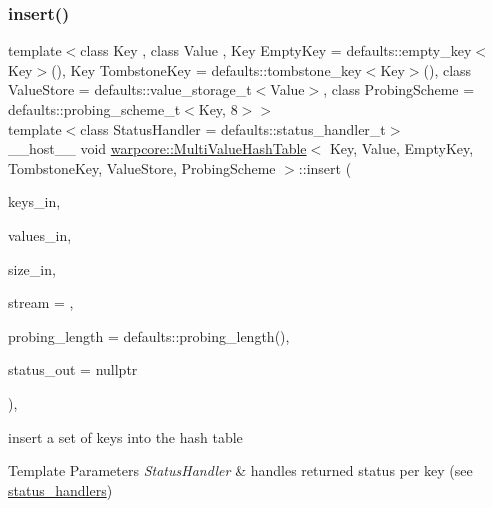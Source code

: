 \subsubsection{\texorpdfstring{insert()}{insert()}\hspace{0.1cm}{\footnotesize\ttfamily [2/2]}}
{\footnotesize\ttfamily template$<$class Key , class Value , Key Empty\+Key = defaults\+::empty\+\_\+key$<$\+Key$>$(), Key Tombstone\+Key = defaults\+::tombstone\+\_\+key$<$\+Key$>$(), class Value\+Store  = defaults\+::value\+\_\+storage\+\_\+t$<$\+Value$>$, class Probing\+Scheme  = defaults\+::probing\+\_\+scheme\+\_\+t$<$\+Key, 8$>$$>$ \\
template$<$class Status\+Handler  = defaults\+::status\+\_\+handler\+\_\+t$>$ \\
\+\_\+\+\_\+host\+\_\+\+\_\+ void \hyperlink{classwarpcore_1_1MultiValueHashTable}{warpcore\+::\+Multi\+Value\+Hash\+Table}$<$ Key, Value, Empty\+Key, Tombstone\+Key, Value\+Store, Probing\+Scheme $>$\+::insert (\begin{DoxyParamCaption}\item[{key\+\_\+type $\ast$}]{keys\+\_\+in,  }\item[{value\+\_\+type $\ast$}]{values\+\_\+in,  }\item[{index\+\_\+type}]{size\+\_\+in,  }\item[{cuda\+Stream\+\_\+t}]{stream = {},  }\item[{index\+\_\+type}]{probing\+\_\+length = {\ttfamily defaults\+:\+:probing\+\_\+length()},  }\item[{typename Status\+Handler\+::base\+\_\+type $\ast$}]{status\+\_\+out = {\ttfamily nullptr} }\end{DoxyParamCaption})\hspace{0.3cm}{\ttfamily [inline]}, {\ttfamily [noexcept]}}



insert a set of keys into the hash table 


\begin{DoxyTemplParams}{Template Parameters}
{\em Status\+Handler} & handles returned status per key (see {\ttfamily \hyperlink{namespacewarpcore_1_1status__handlers}{status\+\_\+handlers}}) \\
\hline
\end{DoxyTemplParams}

